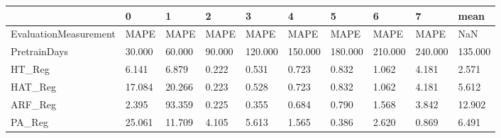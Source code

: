 \begin{tabular}{llllllllll}
\toprule
{} &      0 &      1 &      2 &       3 &       4 &       5 &       6 &       7 &    mean \\
\midrule
EvaluationMeasurement &   MAPE &   MAPE &   MAPE &    MAPE &    MAPE &    MAPE &    MAPE &    MAPE &     NaN \\
PretrainDays          & 30.000 & 60.000 & 90.000 & 120.000 & 150.000 & 180.000 & 210.000 & 240.000 & 135.000 \\
HT\_Reg                &  6.141 &  6.879 &  0.222 &   0.531 &   0.723 &   0.832 &   1.062 &   4.181 &   2.571 \\
HAT\_Reg               & 17.084 & 20.266 &  0.223 &   0.528 &   0.723 &   0.832 &   1.062 &   4.181 &   5.612 \\
ARF\_Reg               &  2.395 & 93.359 &  0.225 &   0.355 &   0.684 &   0.790 &   1.568 &   3.842 &  12.902 \\
PA\_Reg                & 25.061 & 11.709 &  4.105 &   5.613 &   1.565 &   0.386 &   2.620 &   0.869 &   6.491 \\
\bottomrule
\end{tabular}
